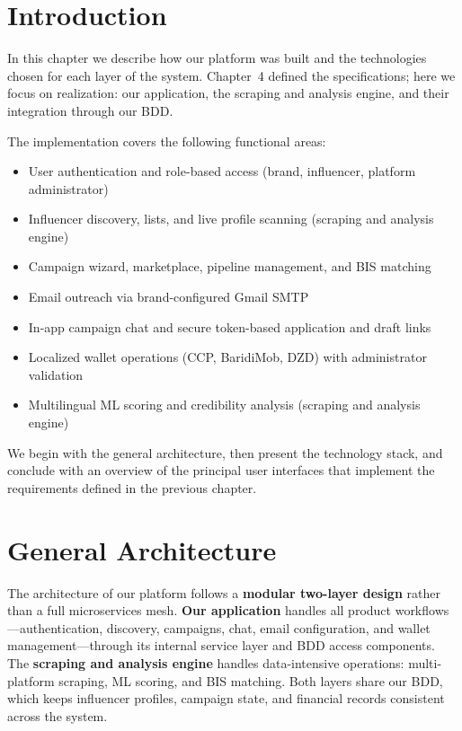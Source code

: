 

\section{Introduction}

In this chapter we describe how our platform was built and the technologies chosen for each layer of the system. Chapter~4 defined the specifications; here we focus on realization: our application, the scraping and analysis engine, and their integration through our BDD.

The implementation covers the following functional areas:

\begin{itemize}
    \item User authentication and role-based access (brand, influencer, platform administrator)
    \item Influencer discovery, lists, and live profile scanning (scraping and analysis engine)
    \item Campaign wizard, marketplace, pipeline management, and BIS matching
    \item Email outreach via brand-configured Gmail SMTP
    \item In-app campaign chat and secure token-based application and draft links
    \item Localized wallet operations (CCP, BaridiMob, DZD) with administrator validation
    \item Multilingual ML scoring and credibility analysis (scraping and analysis engine)
\end{itemize}

We begin with the general architecture, then present the technology stack, and conclude with an overview of the principal user interfaces that implement the requirements defined in the previous chapter.

\section{General Architecture}

The architecture of our platform follows a \textbf{modular two-layer design} rather than a full microservices mesh. \textbf{Our application} handles all product workflows---authentication, discovery, campaigns, chat, email configuration, and wallet management---through its internal service layer and BDD access components. The \textbf{scraping and analysis engine} handles data-intensive operations: multi-platform scraping, ML scoring, and BIS matching. Both layers share our BDD, which keeps influencer profiles, campaign state, and financial records consistent across the system.

